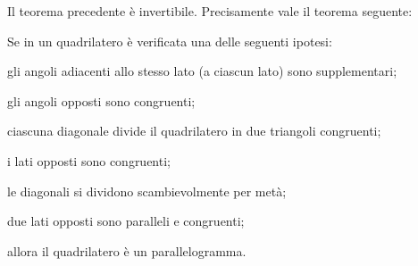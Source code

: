 Il teorema precedente è invertibile. Precisamente vale il teorema seguente:
\begin{teorema}
Se in un quadrilatero è verificata una delle seguenti ipotesi:
\begin{enumerate*}
\item gli angoli adiacenti allo stesso lato (a ciascun lato) sono supplementari;
\item gli angoli opposti sono congruenti;
\item ciascuna diagonale divide il quadrilatero in due triangoli congruenti;
\item i lati opposti sono congruenti;
\item le diagonali si dividono scambievolmente per metà;
\item due lati opposti sono paralleli e congruenti;
\end{enumerate*}
allora il quadrilatero è un parallelogramma.
\end{teorema}

